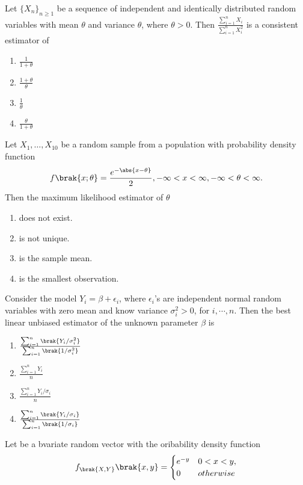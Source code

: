 	\item Let $\{X_n\}_{n \geq 1}$ be a sequence of independent and identically distributed random variables with mean $\theta$ and variance $\theta$, where $\theta > 0$. Then $\frac{\sum_{i=1}^{n} X_i}{\sum_{i=1}^{n} X_i^2}$ is a consistent estimator of
		\begin{enumerate}
			\item $\frac{1}{1+\theta}$
			\item $\frac{1+\theta}{\theta}$
			\item $\frac{1}{\theta}$
			\item $\frac{\theta}{1+\theta}$
		\end{enumerate}
	\item Let $X_1, \dots, X_{10}$ be a random sample from a population with probability density function 
		\begin{align*}
			f\brak{x; \theta} = \frac{e^{-\abs{x - \theta}}}{2}, -\infty < x < \infty, -\infty < \theta < \infty.
		\end{align*}
		Then the maximum likelihood estimator of $\theta$
		\begin{enumerate}
			\item does not exist.
			\item is not unique.
			\item is the sample mean.
			\item is the smallest observation.
		\end{enumerate}
	\item Consider the model $Y_i = \beta + \epsilon_i$, where $\epsilon_i$'s are independent normal random variables with zero mean and know variance $\sigma_i^2>0$, for $i, \cdots, n$. Then the best linear unbiased estimator of the unknown parameter $\beta$ is
		\begin{enumerate}
			\item $\frac{\sum_{i=1}^{n}\brak{Y_i/\sigma_i^2}}{\sum_{i=1}^{n}\brak{1/\sigma_i^2}}$
			\item $\frac{\sum_{i=1}^{n}Y_i}{n}$
			\item $\frac{\sum_{i=1}^{n}Y_i/\sigma_i}{n}$
			\item $\frac{\sum_{i=1}^{n}\brak{Y_i/\sigma_i}}{\sum_{i=1}^{n}\brak{1/\sigma_i}}$
		\end{enumerate}
	\item Let  be a bvariate random vector with the oribability density function 
		\begin{align*}
			f_{\brak{X, Y}}\brak{x,y} = \begin{cases} 
				e^{-y}& 0 < x < y, \\
				0& otherwise
			\end{cases}
		\end{align*}
